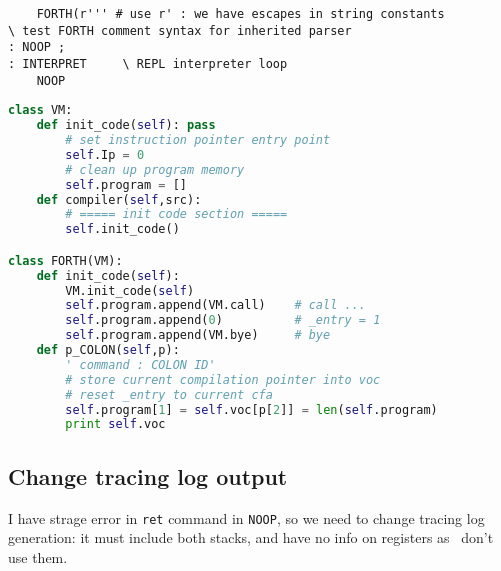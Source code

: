 \begin{lstlisting}
	FORTH(r''' # use r' : we have escapes in string constants
\ test FORTH comment syntax for inherited parser
: NOOP ;
: INTERPRET		\ REPL interpreter loop
	NOOP
\end{lstlisting}
\begin{lstlisting}[language=Python]
class VM:
	def init_code(self): pass
		# set instruction pointer entry point
		self.Ip = 0							
		# clean up program memory	
		self.program = []
	def compiler(self,src):
		# ===== init code section =====
		self.init_code()

class FORTH(VM):
	def init_code(self):
		VM.init_code(self)
		self.program.append(VM.call)	# call ...
		self.program.append(0)			# _entry = 1
		self.program.append(VM.bye)		# bye
  	def p_COLON(self,p):
  		' command : COLON ID'
  		# store current compilation pointer into voc
		# reset _entry to current cfa
  		self.program[1] = self.voc[p[2]] = len(self.program)
		print self.voc
\end{lstlisting}

\subsection{Change tracing log output}

I have strage error in \verb|ret| command in \verb|NOOP|, so we need to change
tracing log generation: it must include both stacks, and have no info on
registers as \F\ don't use them.

